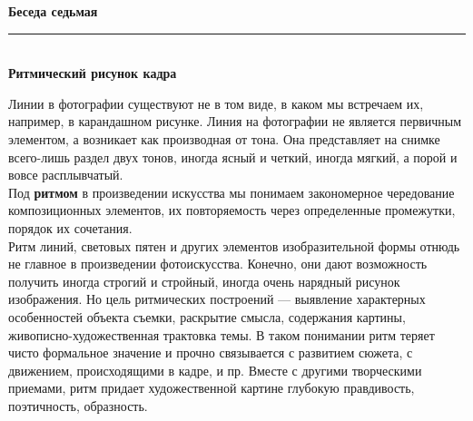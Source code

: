 \documentclass{article}
\newcommand{\important}[1]{\textbf{#1}}
\renewcommand{\section}[2]{
	\vspace{6em}
	\begin{flushright}
		\Large
		\baselineskip=0.5\baselineskip
		\textbf{#1}
		\\
		\rule[0.5\baselineskip]{\textwidth}{0.15pt}
		\\
		\textbf{#2}
	\end{flushright}
}
\begin{document}
\section{Беседа седьмая}{Ритмический рисунок кадра}
Линии в фотографии существуют не в том виде, в каком мы встречаем их, например, в карандашном рисунке. Линия на фотографии не является первичным элементом, а возникает как производная от тона. Она представляет на снимке всего-лишь раздел двух тонов, иногда ясный и четкий, иногда мягкий, а порой и вовсе расплывчатый.\\
Под \important{ритмом} в произведении искусства мы понимаем закономерное чередование композиционных элементов, их повторяемость через определенные промежутки, порядок их сочетания.\\
Ритм линий, световых пятен и других элементов изобразительной формы отнюдь не главное в произведении фотоискусства. Конечно, они дают возможность получить иногда строгий и стройный, иногда очень нарядный рисунок изображения. Но цель ритмических построений --- выявление характерных особенностей объекта съемки, раскрытие смысла, содержания картины, живописно-художественная трактовка темы. В таком понимании ритм теряет чисто формальное значение и прочно связывается с развитием сюжета, с движением, происходящими в кадре, и пр. Вместе с другими творческими приемами, ритм придает художественной картине глубокую правдивость, поэтичность, образность.
\end{document}
